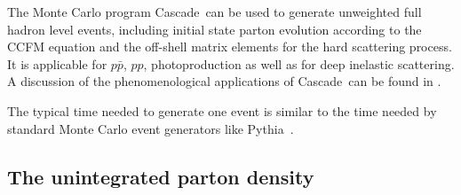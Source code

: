 \documentclass[11pt]{article} \usepackage{mystyle-new}
\newcommand{\PYTHIAMC}{Pythia61}
\def\CASCADE{{\sc Cascade}}
\def\PYTHIA{{\sc Pythia}}
\begin{document}
The Monte Carlo program \CASCADE\ can be used to generate unweighted
full hadron level events, including initial state parton evolution
according to the CCFM equation and the off-shell matrix elements for
the hard scattering process. It is applicable for $p \bar{p}$, $pp$, 
photoproduction as well as for deep inelastic scattering.
A discussion of the phenomenological applications of \CASCADE\  can be found in \cite{Hautmann:2008vd}.

The typical
time needed to generate one event  is
similar to the time needed by standard Monte Carlo event generators
like \PYTHIA~\cite{\PYTHIAMC}.  


\subsection{The unintegrated parton density}
\end{document}
